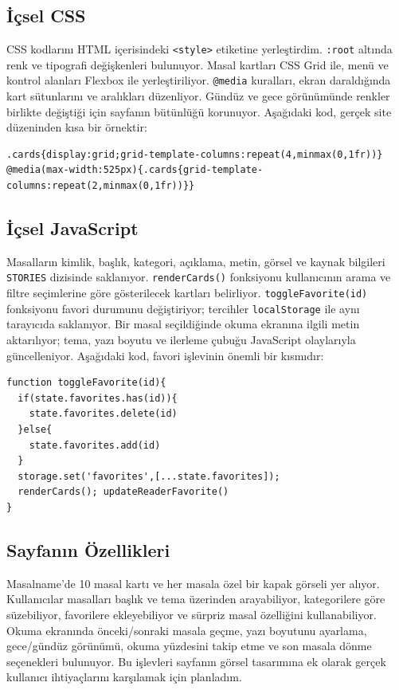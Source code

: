 \documentclass[10pt,a4paper]{article}
\begin{document}
\subsection{İçsel CSS}
CSS kodlarını HTML içerisindeki \texttt{<style>} etiketine yerleştirdim. \texttt{:root} altında renk ve tipografi değişkenleri bulunuyor. Masal kartları CSS Grid ile, menü ve kontrol alanları Flexbox ile yerleştiriliyor. \texttt{@media} kuralları, ekran daraldığında kart sütunlarını ve aralıkları düzenliyor. Gündüz ve gece görünümünde renkler birlikte değiştiği için sayfanın bütünlüğü korunuyor. Aşağıdaki kod, gerçek site düzeninden kısa bir örnektir:
\begin{verbatim}
.cards{display:grid;grid-template-columns:repeat(4,minmax(0,1fr))}
@media(max-width:525px){.cards{grid-template-columns:repeat(2,minmax(0,1fr))}}
\end{verbatim}
\subsection{İçsel JavaScript}
Masalların kimlik, başlık, kategori, açıklama, metin, görsel ve kaynak bilgileri \texttt{STORIES} dizisinde saklanıyor. \texttt{renderCards()} fonksiyonu kullanıcının arama ve filtre seçimlerine göre gösterilecek kartları belirliyor. \texttt{toggleFavorite(id)} fonksiyonu favori durumunu değiştiriyor; tercihler \texttt{localStorage} ile aynı tarayıcıda saklanıyor. Bir masal seçildiğinde okuma ekranına ilgili metin aktarılıyor; tema, yazı boyutu ve ilerleme çubuğu JavaScript olaylarıyla güncelleniyor. Aşağıdaki kod, favori işlevinin önemli bir kısmıdır:
\begin{verbatim}
function toggleFavorite(id){
  if(state.favorites.has(id)){
    state.favorites.delete(id)
  }else{
    state.favorites.add(id)
  }
  storage.set('favorites',[...state.favorites]);
  renderCards(); updateReaderFavorite()
}
\end{verbatim}
\subsection{Sayfanın Özellikleri}
Masalname'de 10 masal kartı ve her masala özel bir kapak görseli yer alıyor. Kullanıcılar masalları başlık ve tema üzerinden arayabiliyor, kategorilere göre süzebiliyor, favorilere ekleyebiliyor ve sürpriz masal özelliğini kullanabiliyor. Okuma ekranında önceki/sonraki masala geçme, yazı boyutunu ayarlama, gece/gündüz görünümü, okuma yüzdesini takip etme ve son masala dönme seçenekleri bulunuyor. Bu işlevleri sayfanın görsel tasarımına ek olarak gerçek kullanıcı ihtiyaçlarını karşılamak için planladım.
\end{document}
